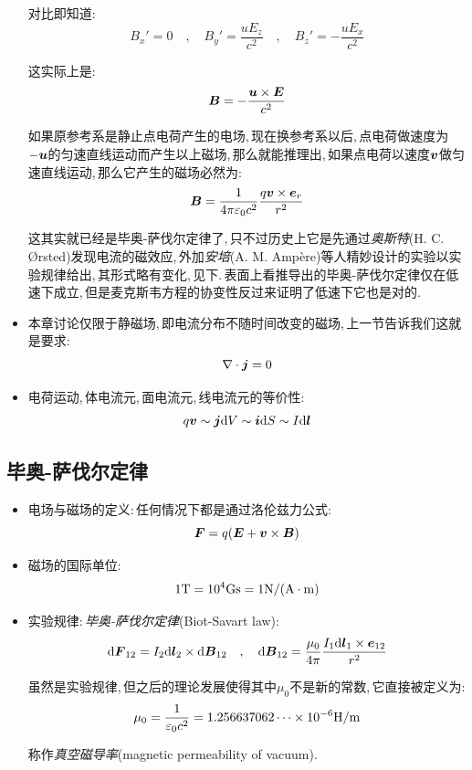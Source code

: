 \begin{itemize}
对比即知道:
\[B_x'=0\quad ,\quad B_y'=\frac{uE_z}{c^2} \quad ,\quad B_z'=-\frac{uE_x}{c^2}\]

这实际上是:
\[\boldsymbol{B}=-\frac{\boldsymbol{u}\times \boldsymbol{E}}{c^2}\]

如果原参考系是静止点电荷产生的电场,\,现在换参考系以后,\,点电荷做速度为$-\boldsymbol{u}$的匀速直线运动而产生以上磁场,\,那么就能推理出,\,如果点电荷以速度$\boldsymbol{v}$做匀速直线运动,\,那么它产生的磁场必然为:
\[\boldsymbol{B}=\frac{1}{4\pi \varepsilon_0 c^2}\frac{q\boldsymbol{v}\times \boldsymbol{e}_r}{r^2}\]

这其实就已经是毕奥-萨伐尔定律了,\,只不过历史上它是先通过\emph{奥斯特}(H. C. \O rsted)发现电流的磁效应,\,外加\emph{安培}(A. M. Amp\`ere)等人精妙设计的实验以实验规律给出,\,其形式略有变化,\,见下.\,表面上看推导出的毕奥-萨伐尔定律仅在低速下成立,\,但是麦克斯韦方程的协变性反过来证明了低速下它也是对的.

\item 本章讨论仅限于静磁场,\,即电流分布不随时间改变的磁场,\,上一节告诉我们这就是要求:
\[\nabla \cdot \boldsymbol{j}=0\]

\item 电荷运动,\,体电流元,\,面电流元,\,线电流元的等价性:
\[q\boldsymbol{v}\sim \boldsymbol{j}\textrm{d} V \sim \boldsymbol{i}\textrm{d} S\sim I\textrm{d} \boldsymbol{l}\]

\end{itemize}

\subsection{毕奥-萨伐尔定律}

\begin{itemize}
\item 电场与磁场的定义:\,任何情况下都是通过洛伦兹力公式:
\[\boldsymbol{F}=q(\boldsymbol{E}+\boldsymbol{v}\times \boldsymbol{B})\]

\item 磁场的国际单位:
\[1{\rm T}=10^4{\rm Gs}=1{\rm N/(A\cdot m)}\]

\item 实验规律:\,\emph{毕奥-萨伐尔定律}(Biot-Savart law):
\[\textrm{d} \boldsymbol{F}_{12}=I_2\textrm{d} \boldsymbol{l}_2\times \textrm{d} \boldsymbol{B}_{12}\quad ,\quad \textrm{d} \boldsymbol{B}_{12}=\frac{\mu_0}{4\pi}\frac{I_1\textrm{d} \boldsymbol{l}_1\times \boldsymbol{e}_{12}}{r^2}\]

虽然是实验规律,\,但之后的理论发展使得其中$\mu_0$不是新的常数,\,它直接被定义为:
\[\mu_0=\frac{1}{\varepsilon_0 c^2}=1.256637062\cdots \times10^{-6}{\rm H/m}\]

称作\emph{真空磁导率}(magnetic permeability of vacuum).
\end{itemize}


